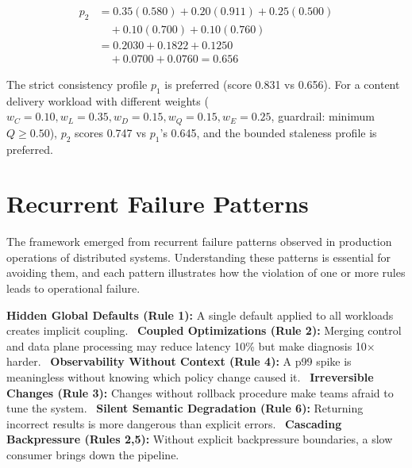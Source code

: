 \documentclass[conference]{IEEEtran}
\begin{document}
{{\begin{align}
p_2 &=0.35(0.580)+0.20(0.911)+0.25(0.500) \nonumber\\
    &\quad +0.10(0.700)+0.10(0.760) \nonumber\\
    &=0.2030+0.1822+0.1250 \nonumber\\
    &\quad +0.0700+0.0760=0.656
\label{eq:score_p2}
\end{align}

The strict consistency profile $p_1$ is preferred (score 0.831 vs 0.656). For a content delivery workload with different weights ($w_C = 0.10, w_L = 0.35, w_D = 0.15, w_Q = 0.15, w_E = 0.25$, guardrail: minimum $Q \geq 0.50$), $p_2$ scores 0.747 vs $p_1$'s 0.645, and the bounded staleness profile is preferred.

\section{Recurrent Failure Patterns}
\label{sec:patterns}
The framework emerged from recurrent failure patterns observed in production operations of distributed systems. Understanding these patterns is essential for avoiding them, and each pattern illustrates how the violation of one or more rules leads to operational failure.

\noindent\textbf{Hidden Global Defaults (Rule 1):} A single default applied to all workloads creates implicit coupling.~\newline
\textbf{Coupled Optimizations (Rule 2):} Merging control and data plane processing may reduce latency 10\% but make diagnosis 10$\times$ harder.~\newline
\textbf{Observability Without Context (Rule 4):} A p99 spike is meaningless without knowing which policy change caused it.~\newline
\textbf{Irreversible Changes (Rule 3):} Changes without rollback procedure make teams afraid to tune the system.~\newline
\textbf{Silent Semantic Degradation (Rule 6):} Returning incorrect results is more dangerous than explicit errors.~\newline
\textbf{Cascading Backpressure (Rules 2,5):} Without explicit backpressure boundaries, a slow consumer brings down the pipeline.

}}
\end{document}
